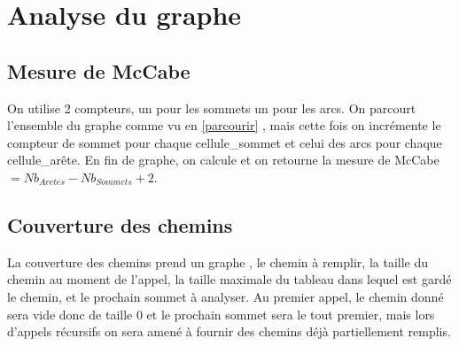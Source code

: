 \documentclass[a4paper,11pt]{article}
\begin{document}
	\section{Analyse du graphe}
	\subsection{Mesure de McCabe}
		On utilise 2 compteurs, un pour les sommets un pour les arcs. On parcourt l'ensemble du graphe comme vu en \ref{parcourir} , mais cette fois on incrémente le compteur de sommet pour chaque cellule\_sommet et celui des arcs pour chaque cellule\_arête. En fin de graphe, on calcule et on retourne la mesure de McCabe $= Nb_{Aretes} - Nb_{Sommets} + 2$.
	\subsection{Couverture des chemins}
		La couverture des chemins prend un graphe , le chemin à remplir, la taille du chemin au moment de l'appel, la taille maximale du tableau dans lequel est gardé le chemin, et le prochain sommet à analyser. Au premier appel, le chemin donné sera vide donc de taille 0 et le prochain sommet sera le tout premier, mais lors d'appels récursifs on sera amené à fournir des chemins déjà partiellement remplis.
\end{document}
